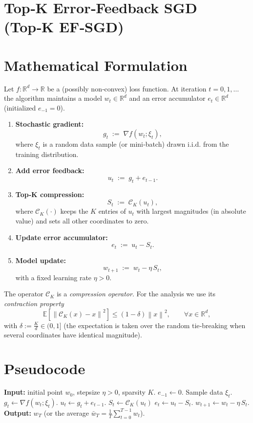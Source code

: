 \documentclass{article}
\newcommand{\E}{\mathbb{E}}
\newcommand{\R}{\mathbb{R}}
\newcommand{\norm}[1]{\left\lVert#1\right\rVert}
\begin{document}
\section*{Top‑K Error‑Feedback SGD (Top‑K EF‑SGD)}

\section*{Mathematical Formulation}
Let $f:\R^{d}\rightarrow\R$ be a (possibly non‑convex) loss function.  
At iteration $t=0,1,\dots$ the algorithm maintains a model $w_t\in\R^{d}$ and an
error accumulator $e_t\in\R^{d}$ (initialized $e_{-1}=0$).  

\begin{enumerate}[label=\textbf{Step \arabic*:},leftmargin=*]
\item \textbf{Stochastic gradient:}
\[
g_t \;:=\; \nabla f(w_t;\xi_t),
\]
where $\xi_t$ is a random data sample (or mini‑batch) drawn i.i.d. from the
training distribution.
\item \textbf{Add error feedback:}
\[
u_t \;:=\; g_t + e_{t-1}.
\]
\item \textbf{Top‑K compression:}
\[
S_t \;:=\; \mathcal{C}_{K}(u_t),
\]
where $\mathcal{C}_{K}(\cdot)$ keeps the $K$ entries of $u_t$ with largest
magnitudes (in absolute value) and sets all other coordinates to zero.
\item \textbf{Update error accumulator:}
\[
e_t \;:=\; u_t - S_t .
\]
\item \textbf{Model update:}
\[
w_{t+1} \;:=\; w_t - \eta\, S_t ,
\]
with a fixed learning rate $\eta>0$.
\end{enumerate}

The operator $\mathcal{C}_{K}$ is a \emph{compression operator}.  For the
analysis we use its \emph{contraction property}
\begin{equation}
\label{eq:contraction}
\E\!\left[\norm{\mathcal{C}_{K}(x)-x}^{2}\right]\le (1-\delta)\norm{x}^{2},
\qquad\forall x\in\R^{d},
\end{equation}
with $\delta:=\frac{K}{d}\in(0,1]$ (the expectation is taken over the random
tie‑breaking when several coordinates have identical magnitude).

\section*{Pseudocode}
\begin{algorithm}[H]
\caption{Top‑K EF‑SGD}
\begin{algorithmic}[1]
\STATE \textbf{Input:} initial point $w_0$, stepsize $\eta>0$, sparsity $K$.
\STATE $e_{-1}\gets 0$.
    \STATE Sample data $\xi_t$.
    \STATE $g_t \gets \nabla f(w_t;\xi_t)$.
    \STATE $u_t \gets g_t + e_{t-1}$.
    \STATE $S_t \gets \mathcal{C}_{K}(u_t)$ \hfill{}
    \STATE $e_t \gets u_t - S_t$.
    \STATE $w_{t+1} \gets w_t - \eta\, S_t$.
\ENDFOR
\STATE \textbf{Output:} $w_T$ (or the average $\bar w_T=\frac1T\sum_{t=0}^{T-1}w_t$).
\end{algorithmic}
\end{algorithm}
\end{document}
